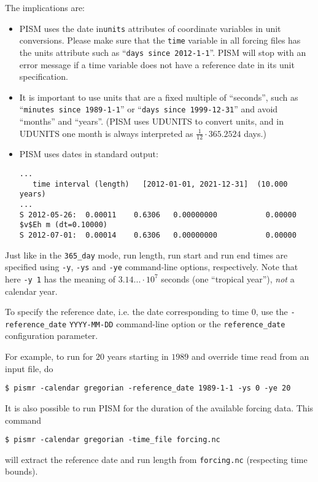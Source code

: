 \documentclass[titlepage,letterpaper,final]{scrartcl}
\newcommand{\intextoption}[1]{\texttt{-#1}\optindex{\texttt{-#1}}}
\newcommand{\txtopt}[2]{\texttt{-#1} #2\optindex{\texttt{-#1} #2}}
\begin{document}
The implications are:
\begin{itemize}
\item PISM uses the date in\texttt{units} attributes of coordinate variables in
  unit conversions. Please make sure that the \texttt{time} variable in all
  forcing files has the units attribute such as ``\texttt{days since
    2012-1-1}''. PISM will stop with an error message if a time variable does
  not have a reference date in its unit specification.

\item It is important to use units that are a fixed multiple of ``seconds'',
  such as ``\texttt{minutes since 1989-1-1}'' or ``\texttt{days since
    1999-12-31}'' and avoid ``months'' and ``years''. (PISM uses UDUNITS to
  convert units, and in UDUNITS one month is always interpreted as
  $\frac{1}{12}\cdot 365.2524$ days.)
\item PISM uses dates in standard output:
\begin{verbatim}
...
   time interval (length)   [2012-01-01, 2021-12-31]  (10.000 years)
...
S 2012-05-26:  0.00011    0.6306   0.00000000           0.00000
$v$Eh m (dt=0.10000)
S 2012-07-01:  0.00014    0.6306   0.00000000           0.00000
\end{verbatim}
\end{itemize}

Just like in the \texttt{365_day} mode, run length, run start and run end times
are specified using \intextoption{y}, \intextoption{ys} and \intextoption{ye}
command-line options, respectively. Note that here \texttt{-y 1} has the
meaning of $3.14...\cdot 10^{7}$ seconds (one ``tropical year''), \emph{not} a
calendar year.

To specify the reference date, i.e. the date corresponding to time $0$, use the
\txtopt{reference_date}{\texttt{YYYY-MM-DD}} command-line option or the
\texttt{reference_date} configuration parameter.

For example, to run for $20$ years starting in $1989$ and override time read
from an input file, do
\begin{verbatim}
$ pismr -calendar gregorian -reference_date 1989-1-1 -ys 0 -ye 20
\end{verbatim}

It is also possible to run PISM for the duration of the available forcing data.
This command
\begin{verbatim}
$ pismr -calendar gregorian -time_file forcing.nc
\end{verbatim}
will extract the reference date and run length from \texttt{forcing.nc}
(respecting time bounds).
\end{document}
